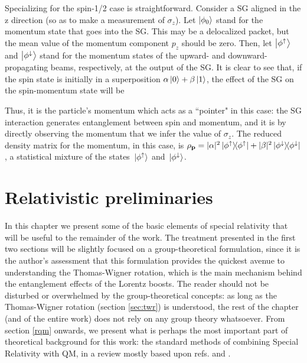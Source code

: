 \documentclass[12pt,a4paper,notitlepage]{report}
\begin{document}
Specializing for the spin-1/2 case is straightforward. Consider a SG aligned in the z direction (so as to make a measurement of $\sigma_z$). Let $\ket{\phi_0}$ stand for the momentum state that goes into the SG. This may be a delocalized packet, but the mean value of the momentum component $p_z$ should be zero. Then, let $\ket{\phi^\uparrow}$ and $\ket{\phi^\downarrow}$ stand for the momentum states of the upward- and downward-propagating beams, respectively, at the output of the SG. It is clear to see that, if the spin state is initially in a superposition $\alpha \ket{0} + \beta \ket{1}$, the effect of the SG on the spin-momentum state will be

%
Thus, it is the particle's momentum which acts as a ``pointer" in this case: the SG interaction generates entanglement between spin and momentum, and it is by directly observing the momentum that we infer the value of $\sigma_z$. The reduced density matrix for the momentum, in this case, is $\rho_{\vb{p}} = |\alpha|^2 \dyad*{\phi^\uparrow} + |\beta|^2 \dyad*{\phi^\downarrow}$, a statistical mixture of the states $\ket*{\phi^\uparrow}$ and $\ket*{\phi^\downarrow}$.

\pagebreak

\chapter{Relativistic preliminaries}

In this chapter we present some of the basic elements of special relativity that will be useful to the remainder of the work. The treatment presented in the first two sections will be slightly focused on a group-theoretical formulation, since it is the author's assessment that this formulation provides the quickest avenue to understanding the Thomas-Wigner rotation, which is the main mechanism behind the entanglement effects of the Lorentz boosts. 
The reader should not be disturbed or overwhelmed by the group-theoretical concepts: as long as the Thomas-Wigner rotation (section \ref{sec:twr}) is understood, the rest of the chapter (and of the entire work) does not rely on any group theory whatsoever.
From section \ref{rqm} onwards, we present what is perhaps the most important part of theoretical background for this work: the standard methods of combining Special Relativity with QM, in a review mostly based upon refs. \cite{weinberg} and \cite{halpern_1968}.
\end{document}

